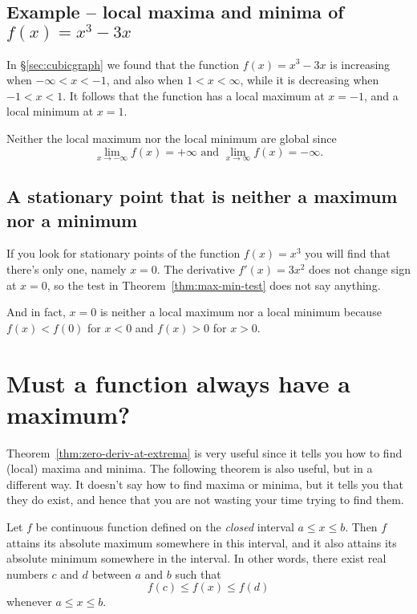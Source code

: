 \subsection{Example -- local maxima and minima of $f(x) = x^3-3x$} %
\label{sec:locmaxminofcubic}%
In \S\ref{sec:cubicgraph} we found that the function $f(x) =
x^3-3x$ is increasing when $-\infty<x<-1$, and also when $1<x<\infty$,
while it is decreasing when $-1<x<1$.  It follows that the function
has a local maximum at $x=-1$, and a local minimum at $x=1$.

Neither the local maximum nor the local minimum are global since
\[
\lim_{x\to-\infty} f(x) = +\infty\text{ and } \lim_{x\to\infty} f(x) = -\infty.
\]


\subsection{A stationary point that is neither a maximum nor a minimum} %
If you look for stationary points of the function $f(x) = x^3$ you will find that
there's only one, namely $x=0$.  The derivative $f'(x)=3x^2$ does not change
sign at $x=0$, so the test in Theorem~\ref{thm:max-min-test} does not say
anything.




And in fact, $x=0$ is neither a local maximum nor a local minimum because
$f(x)<f(0)$ for $x<0$ and $f(x)>0$ for $x>0$.
\marginpar{%
  }

\section{Must a function always have a maximum?} %
\label{sec:max-exists}
Theorem~\ref{thm:zero-deriv-at-extrema} is very useful since it tells
you how to find (local) maxima and minima.  The following theorem is
also useful, but in a different way.  It doesn't say how to find
maxima or minima, but it tells you that they do exist, and hence that
you are not wasting your time trying to find them.




\begin{theorem}\label{thm:max-min-exist}
  Let $f$ be continuous function defined on the \emph{closed} interval
  $a\leq x\leq b$.  Then $f$ attains its absolute maximum somewhere in this
  interval, and it also attains its absolute minimum somewhere in the interval.
  In other words, there exist real numbers $c$ and $d$ between $a$ and $b$ such that
  \[
  f(c)\leq f(x) \leq f(d)
  \]
  whenever $a\leq x\leq b$.
\end{theorem}\smallskip




